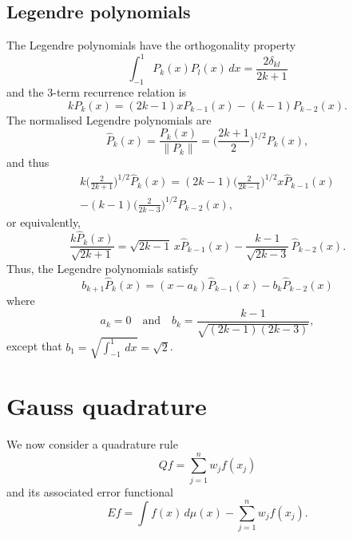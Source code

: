\documentclass[12pt,a4paper]{article}
\begin{document}
\subsection{Legendre polynomials}
The Legendre polynomials have the orthogonality property
\begin{equation}\label{eq: legendre orthog}
\int_{-1}^1 P_k(x)P_l(x)\,dx=\frac{2\delta_{kl}}{2k+1}
\end{equation}
and the 3-term recurrence relation is
\begin{equation}\label{eq: legendre 3 term}
kP_k(x)=(2k-1)xP_{k-1}(x)-(k-1)P_{k-2}(x).
\end{equation}
The normalised Legendre polynomials are
\[
\hat P_k(x)=\frac{P_k(x)}{\|P_k\|}=\biggl(\frac{2k+1}{2}\biggr)^{1/2}
	P_k(x),
\]
and thus
\begin{multline*}
k\biggl(\frac{2}{2k+1}\biggr)^{1/2}\hat P_k(x)
	=(2k-1)\biggl(\frac{2}{2k-1}\biggr)^{1/2}x\hat P_{k-1}(x)\\
	-(k-1)\biggl(\frac{2}{2k-3}\biggr)^{1/2}\hat P_{k-2}(x),
\end{multline*}
or equivalently,
\[
\frac{k\hat P_k(x)}{\sqrt{2k+1}}=\sqrt{2k-1}\,x\hat P_{k-1}(x)
	-\frac{k-1}{\sqrt{2k-3}}\,\hat P_{k-2}(x).
\]
Thus, the Legendre polynomials satisfy
\[
b_{k+1}\hat P_k(x)=(x-a_k)\hat P_{k-1}(x)-b_k\hat P_{k-2}(x)
\]
where
\[
a_k=0\quad\text{and}\quad b_k=\frac{k-1}{\sqrt{(2k-1)(2k-3)}},
\]
except that $b_1=\sqrt{\int_{-1}^1\,dx}=\sqrt{2}$.

\section{Gauss quadrature}
We now consider a quadrature rule
\begin{equation}\label{eq: Qf}
Qf=\sum_{j=1}^n w_jf(x_j)
\end{equation}
and its associated error functional
\[
Ef=\int f(x)\,d\mu(x)-\sum_{j=1}^n w_jf(x_j).
\]
\end{document}
